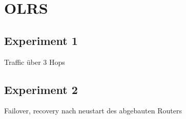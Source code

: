 \documentclass[10pt]{scrartcl}
\begin{document}
\section{OLRS}
	\subsection{Experiment 1}
	Traffic über 3 Hops	
	
	\subsection{Experiment 2}
	Failover, recovery nach neustart des abgebauten Routers


\end{document}

